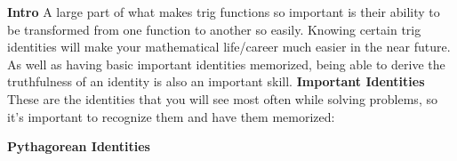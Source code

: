 \documentclass[addpoints]{exam}
\begin{document}
    \begin{tcolorbox}[breakable, title=TRIG IDENTITIES, colframe=black, sharp corners, colback=white, colbacktitle=white, coltitle=black]
        \Large \textbf{Intro}
        \newline\normalsize A large part of what makes trig functions so important is their ability to be transformed from one function to another so easily. Knowing certain trig identities will make your mathematical life/career much easier in the near future. As well as having basic important identities memorized, being able to derive the truthfulness of an identity is also an important skill.
        \noindent\makebox[\linewidth]{\hrulefill}
        \vspace{0.1in}
        \newline\Large\textbf{Important Identities}
        \newline\normalsize These are the identities that you will see most often while solving problems, so it's important to recognize them and have them memorized: \\
        \begin{center}
            \textbf{Pythagorean Identities}
        \end{center}


\end{tcolorbox}
\end{document}
